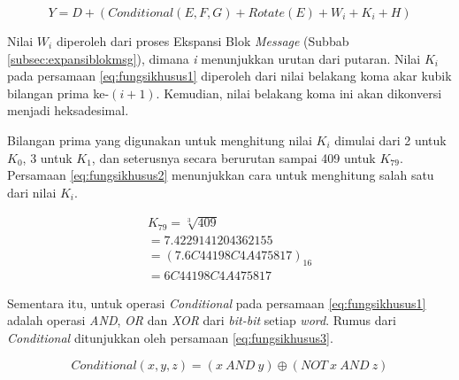 \begin{equation}
	Y = D + (Conditional(E,F,G) + Rotate(E) + W_i + K_i + H) \label{eq:fungsikhusus1}
\end{equation}

Nilai \begin{math}W_i\end{math} diperoleh dari proses Ekspansi Blok \textit{Message} (Subbab \ref{subsec:expansiblokmsg}), dimana \textit{i} menunjukkan urutan dari putaran. Nilai \begin{math}K_i\end{math} pada persamaan \ref{eq:fungsikhusus1} diperoleh dari nilai belakang koma akar kubik bilangan prima ke-\begin{math}(i+1)\end{math}. Kemudian, nilai belakang koma ini akan dikonversi menjadi heksadesimal. 

Bilangan prima yang digunakan untuk menghitung nilai \begin{math}K_i\end{math} dimulai dari 2 untuk \begin{math}K_0\end{math}, 3 untuk \begin{math}K_1\end{math}, dan seterusnya secara berurutan sampai 409 untuk \begin{math}K_{79}\end{math}. Persamaan \ref{eq:fungsikhusus2} menunjukkan cara untuk menghitung salah satu dari nilai \begin{math}K_i\end{math}.

\begin{gather}
	K_{79} = \sqrt[3]{409} \nonumber \\
	= 7.4229141204362155 \nonumber \\
	= (7.6C44198C4A475817)_{16} \label{eq:fungsikhusus2} \\
	= 6C44198C4A475817 \nonumber
\end{gather}

Sementara itu, untuk operasi \textit{Conditional} pada persamaan \ref{eq:fungsikhusus1} adalah operasi \textit{AND}, \textit{OR} dan \textit{XOR} dari \textit{bit-bit} setiap \textit{word}. Rumus dari \textit{Conditional} ditunjukkan oleh persamaan \ref{eq:fungsikhusus3}.

\begin{equation}
	Conditional(x,y,z) = (x\: AND\: y) \oplus (NOT\: x\: AND\: z) \label{eq:fungsikhusus3}
\end{equation}

